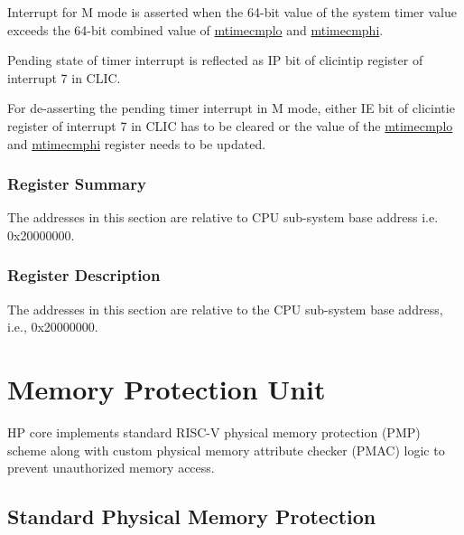 \documentclass[main\_\_EN.tex]{subfiles}
\begin{document}
Interrupt for M mode is asserted when the 64-bit value of the system timer value exceeds the 64-bit combined value of \hyperref[regdesc:CLINTMTIMECMPLOREG]{mtimecmplo} and \hyperref[regdesc:CLINTMTIMECMPHIREG]{mtimecmphi}.

Pending state of timer interrupt is reflected as IP bit of clicintip register of interrupt 7 in CLIC.

For de-asserting the pending timer interrupt in M mode, either IE bit of clicintie register of interrupt 7 in CLIC has to be cleared or the value of the \hyperref[regdesc:CLINTMTIMECMPLOREG]{mtimecmplo} and \hyperref[regdesc:CLINTMTIMECMPHIREG]{mtimecmphi} register needs to be updated.


\hypertarget{riscvcpu-clint-reg-summ}{}
\subsubsection{Register Summary}
\label{sec:riscvcpu-clint-reg-summ}
The addresses in this section are relative to CPU sub-system base address i.e. 0x20000000.




\subsubsection{Register Description}

The addresses in this section are relative to the CPU sub-system base address, i.e., 0x20000000.



\newpage
\section{Memory Protection Unit}
HP core implements standard RISC-V physical memory protection (PMP) scheme along with custom physical memory attribute checker (PMAC) logic to prevent unauthorized memory access.

\subsection{Standard Physical Memory Protection}
\label{sec:riscvcpu-pmp}
\end{document}
